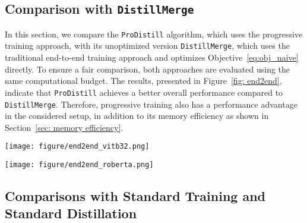 \subsection{Comparison with \texttt{DistillMerge} }
\label{apx: end2end}
In this section, we compare the \texttt{ProDistill} algorithm, which uses the progressive training approach, with its unoptimized version \texttt{DistillMerge}, which uses the traditional end-to-end training approach and optimizes Objective~\ref{eq:obj_naive} directly. To ensure a fair comparison, both approaches are evaluated using the same computational budget.
The results, presented in Figure~\ref{fig: end2end}, indicate that \texttt{ProDistill} achieves a better overall performance compared to \texttt{DistillMerge}. Therefore, progressive training also has a performance advantage in the considered setup,  in addition to its memory efficiency as shown in Section~\ref{sec: memory efficiency}.



\begin{figure*}[!h]
    \centering
    \begin{minipage}{0.45\textwidth}
        \centering
        \texttt{[image: figure/end2end\_vitb32.png]}
    \end{minipage}%
    \hspace{0.0\textwidth} 
    \begin{minipage}{0.45\textwidth}
        \centering
        \texttt{[image: figure/end2end\_roberta.png]}
    \end{minipage}
    \caption{\textbf{Comparison between \texttt{ProDistill} and \texttt{DistillMerge}.} Left: Accuracy results on 8 vision benchmarks using ViT-B-32. Right: Performance metrics on the NLU tasks using RoBERTa. The results demonstrate the performance improvement of progressive training in \texttt{ProDistill}, compared to end-to-end training in \texttt{DistillMerge}, despite the latter being more resource-intensive.}
    \label{fig: end2end}
\end{figure*}

\subsection{Comparisons with Standard Training and Standard Distillation}
\label{apx: direct train}

